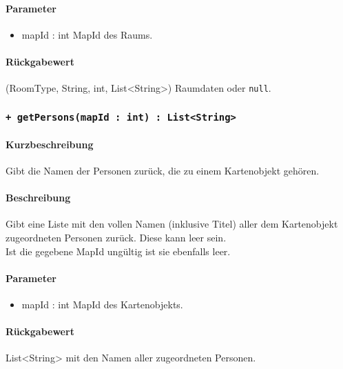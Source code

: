\paragraph*{Parameter}
\begin{itemize}
    \item mapId : int MapId des Raums.
\end{itemize}
\paragraph*{Rückgabewert}
(RoomType, String, int, List<String>) Raumdaten oder \texttt{null}.

\subsubsection*{\texttt{+ getPersons(mapId : int) : List<String>}}%
\paragraph*{Kurzbeschreibung}
Gibt die Namen der Personen zurück, die zu einem Kartenobjekt gehören.
\paragraph*{Beschreibung}
Gibt eine Liste mit den vollen Namen (inklusive Titel) aller dem Kartenobjekt zugeordneten 
Personen zurück. Diese kann leer sein.\\
Ist die gegebene MapId ungültig ist sie ebenfalls leer.
\paragraph*{Parameter}
\begin{itemize}
    \item mapId : int MapId des Kartenobjekts.
\end{itemize}
\paragraph*{Rückgabewert}
List<String> mit den Namen aller zugeordneten Personen.

